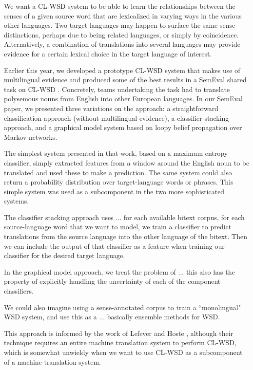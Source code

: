 We want a CL-WSD system to be able to learn the relationships between the
senses of a given source word that are lexicalized in varying ways in the
various other languages. Two target languages may happen to surface the same
sense distinctions, perhaps due to being related languages, or simply
by coincidence. Alternatively, a combination of translations into several
languages may provide evidence for a certain lexical choice in the target
language of interest.

Earlier this year, we developed a prototype CL-WSD system that makes use of
multilingual evidence \cite{rudnick-liu-gasser:2013:SemEval-2013} and produced
some of the best results in a SemEval shared task on CL-WSD \cite{task10}.
Concretely, teams undertaking the task had to translate polysemous nouns from
English into other European languages.
In our SemEval paper, we presented three variations on the approach:
a straightforward classification approach (without multilingual evidence), a
classifier stacking approach, and a graphical model system based on loopy
belief propagation over Markov networks.

The simplest system presented in that work, based on a maximum entropy
classifier, simply extracted features from a window around the English noun to
be translated and used these to make a prediction. The same system could also
return a probability distribution over target-language words or phrases. This
simple system was used as a subcomponent in the two more sophisticated systems.

The classifier stacking approach uses
... %
for each available bitext corpus, for each source-language word that we want to
model, we train a classifier to predict translations from the source language
into the other language of the bitext.
Then we can include the output of that classifier as a feature when training
our classifier for the desired target language.


In the graphical model approach, we treat the problem of 
... this also has the property of explicitly handling the uncertainty of each
of the component classifiers.


We could also imagine using a sense-annotated corpus to train a ``monolingual"
WSD system, and use this as a 
... basically ensemble methods for WSD.
\cite{brown1992class}

This approach is informed by the work of Lefever and Hoste
\cite{lefever-hoste-decock:2011:ACL-HLT2011}, although their technique requires
an entire machine translation system to perform CL-WSD, which is somewhat
unwieldy when we want to use CL-WSD as a subcomponent of a machine translation
system.


